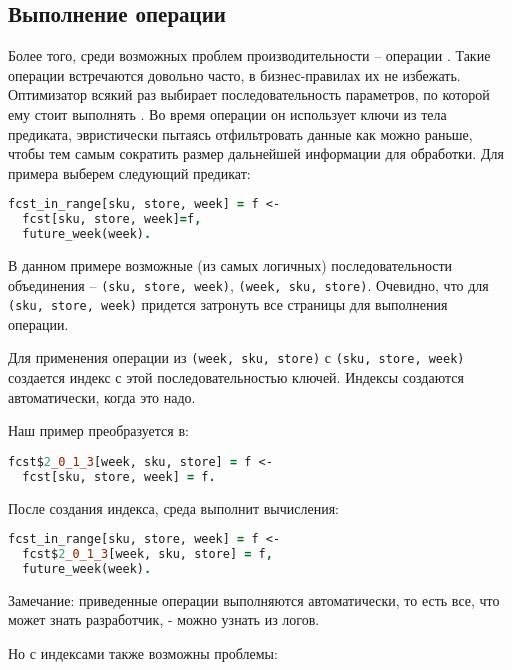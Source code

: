 \subsection{Выполнение операции \join}
\label{sec:technology:join}

Более того, среди возможных проблем производительности – операции \join. Такие операции встречаются довольно часто, в бизнес-\-пра\-ви\-лах их не избежать. Оптимизатор всякий раз выбирает последовательность параметров, по которой ему стоит выполнять \join. Во время операции он использует ключи из тела предиката, эвристически пытаясь отфильтровать данные как можно раньше, чтобы тем самым сократить размер дальнейшей информации для обработки.
Для примера выберем следующий предикат:

\begin{lstlisting}[language=Prolog]
fcst_in_range[sku, store, week] = f <-
  fcst[sku, store, week]=f,
  future_week(week).
\end{lstlisting}

В данном примере возможные (из самых логичных) последовательности объединения – \lstinline{(sku, store, week)}, \lstinline{(week, sku, store)}. Очевидно, что для \lstinline{(sku, store, week)} придется затронуть все страницы для выполнения операции.

Для применения операции из \lstinline{(week, sku, store)} с \lstinline{(sku, store, week)} создается индекс с этой последовательностью ключей. Индексы создаются автоматически, когда это надо.

Наш пример преобразуется в:

\begin{lstlisting}[language=Prolog]
fcst$2_0_1_3[week, sku, store] = f <-
  fcst[sku, store, week] = f.
\end{lstlisting}

После создания индекса, среда выполнит вычисления:

\begin{lstlisting}[language=Prolog]
fcst_in_range[sku, store, week] = f <-
  fcst$2_0_1_3[week, sku, store] = f,
  future_week(week).
\end{lstlisting}

Замечание: приведенные операции выполняются автоматически, то есть все, что может знать разработчик, - можно узнать из логов.

Но с индексами также возможны проблемы:

